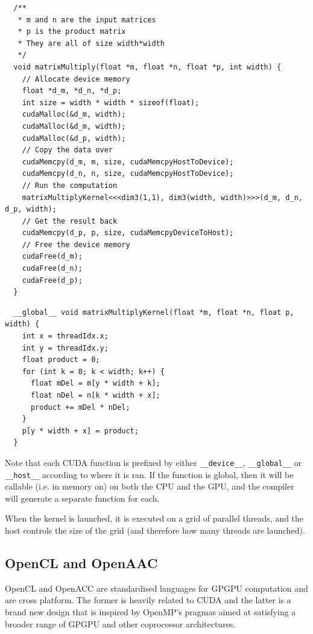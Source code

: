 \begin{verbatim}
  /**
   * m and n are the input matrices
   * p is the product matrix
   * They are all of size width*width
   */
  void matrixMultiply(float *m, float *n, float *p, int width) {
    // Allocate device memory
    float *d_m, *d_n, *d_p;
    int size = width * width * sizeof(float);
    cudaMalloc(&d_m, width);
    cudaMalloc(&d_m, width);
    cudaMalloc(&d_p, width);
    // Copy the data over
    cudaMemcpy(d_m, m, size, cudaMemcpyHostToDevice);
    cudaMemcpy(d_n, n, size, cudaMemcpyHostToDevice);
    // Run the computation
    matrixMultiplyKernel<<<dim3(1,1), dim3(width, width)>>>(d_m, d_n, d_p, width);
    // Get the result back
    cudaMemcpy(d_p, p, size, cudaMemcpyDeviceToHost);
    // Free the device memory
    cudaFree(d_m);
    cudaFree(d_n);
    cudaFree(d_p);
  }
\end{verbatim}

\begin{verbatim}
  __global__ void matrixMultiplyKernel(float *m, float *n, float p, width) {
    int x = threadIdx.x;
    int y = threadIdx.y;
    float product = 0;
    for (int k = 0; k < width; k++) {
      float mDel = m[y * width + k];
      float nDel = n[k * width + x];
      product += mDel * nDel;
    }
    p[y * width + x] = product;
  }
\end{verbatim}

Note that each CUDA function is prefixed by
either \texttt{\_\_device\_\_}, \texttt{\_\_global\_\_}
or \texttt{\_\_host\_\_} according to where it is ran. If the function
is global, then it will be callable (i.e. in memory on) on both the
CPU and the GPU, and the compiler will generate a separate function
for each.

When the kernel is launched, it is executed on a grid of parallel
threads, and the host controls the size of the grid (and therefore how
many threads are launched).

\subsection{OpenCL and OpenAAC}

OpenCL and OpenACC are standardised languages for GPGPU computation
and are cross platform. The former is heavily related to CUDA and the
latter is a brand new design that is inspired by OpenMP's pragmas
aimed at satisfying a broader range of GPGPU and other coprocessor
architectures.


